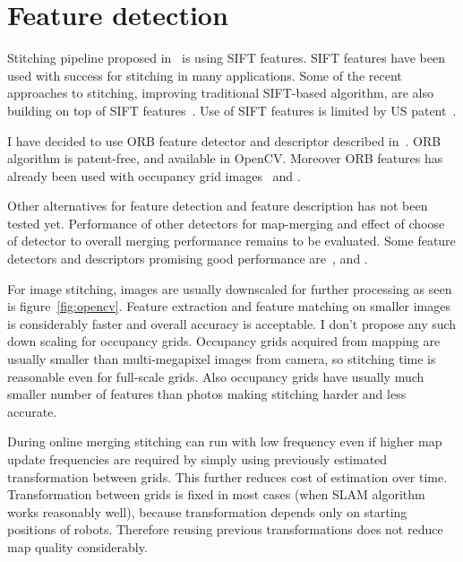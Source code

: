 
\section{Feature detection} %
\label{sec:featuredetection}

Stitching pipeline proposed in~\cite{Brown2006} is using \gls{SIFT} features. \gls{SIFT} features have been used with success for stitching in many applications. Some of the recent approaches to stitching, improving traditional \gls{SIFT}-based algorithm, are also building on top of \gls{SIFT} features~\cite{Xie2015}. Use of \gls{SIFT} features is limited by US patent~\cite{lowe2004method}.

I have decided to use \gls{ORB} feature detector and descriptor described in~\cite{Rublee2011}. \gls{ORB} algorithm is patent-free, and available in \gls{OpenCV}. Moreover \gls{ORB} features has already been used with occupancy grid images~\cite{MapstitchROS} and \cite{Andre2014}.

Other alternatives for feature detection and feature description has not been tested yet. Performance of other detectors for map-merging and effect of choose of detector to overall merging performance remains to be evaluated. Some feature detectors and descriptors promising good performance are~\cite{Alahi2012}, \cite{alcantarilla2011fast} and \cite{calonder2010brief}.

For image stitching, images are usually downscaled for further processing as seen is figure~\ref{fig:opencv}. Feature extraction and feature matching on smaller images is considerably faster and overall accuracy is acceptable. I don't propose any such down scaling for occupancy grids. Occupancy grids acquired from mapping are usually smaller than multi-megapixel images from camera, so stitching time is reasonable even for full-scale grids. Also occupancy grids have usually much smaller number of features than photos making stitching harder and less accurate.

During online merging stitching can run with low frequency even if higher map update frequencies are required by simply using previously estimated transformation between grids. This further reduces cost of estimation over time. Transformation between grids is fixed in most cases (when \gls{SLAM} algorithm works reasonably well), because transformation depends only on starting positions of robots. Therefore reusing previous transformations does not reduce map quality considerably.

